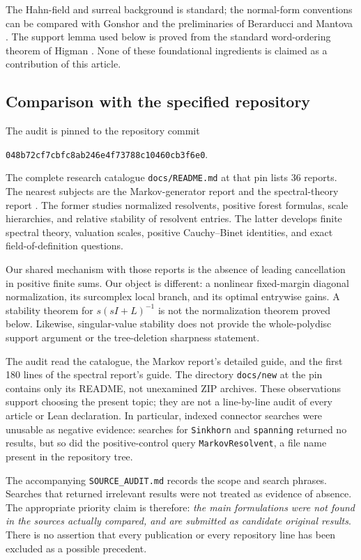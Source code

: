 \documentclass[11pt,a4paper]{article}
\numberwithin{equation}{section}
\theoremstyle{definition}
\newcommand{\pin}{048b72cf7cbfc8ab246e4f73788c10460cb3f6e0}
\begin{document}
The Hahn-field and surreal background is standard; the normal-form
conventions can be compared with Gonshor \cite{Gonshor} and the
preliminaries of Berarducci and Mantova \cite{BM}. The support lemma
used below is proved from the standard word-ordering theorem of
Higman \cite{Higman}. None of these foundational ingredients is
claimed as a contribution of this article.

\subsection{Comparison with the specified repository}
The audit is pinned to the repository commit
\begin{center}\small\texttt{\pin}.\end{center}
The complete research catalogue \texttt{docs/README.md} at that pin
lists 36 reports. The nearest subjects are the Markov-generator report
and the spectral-theory report \cite{RepoCatalogue,RepoMarkov,RepoSpectral}.
The former studies normalized resolvents, positive forest formulas,
scale hierarchies, and relative stability of resolvent entries. The
latter develops finite spectral theory, valuation scales, positive
Cauchy--Binet identities, and exact field-of-definition questions.

Our shared mechanism with those reports is the absence of leading
cancellation in positive finite sums. Our object is different: a
nonlinear fixed-margin diagonal normalization, its surcomplex local
branch, and its optimal entrywise gains. A stability theorem for
$s(sI+L)^{-1}$ is not the normalization theorem proved below.
Likewise, singular-value stability does not provide the whole-polydisc
support argument or the tree-deletion sharpness statement.

The audit read the catalogue, the Markov report's detailed guide, and
the first 180 lines of the spectral report's guide. The directory
\texttt{docs/new} at the pin contains only its README, not unexamined
ZIP archives. These observations support choosing the present topic;
they are not a line-by-line audit of every article or Lean declaration.
In particular, indexed connector searches were unusable as negative
evidence: searches for \texttt{Sinkhorn} and \texttt{spanning} returned
no results, but so did the positive-control query
\texttt{MarkovResolvent}, a file name present in the repository tree.

The accompanying \texttt{SOURCE\_AUDIT.md} records the scope and search
phrases. Searches that returned irrelevant results were not treated as
evidence of absence. The appropriate priority claim is therefore:
\emph{the main formulations were not found in the sources actually
compared, and are submitted as candidate original results}. There is
no assertion that every publication or every repository line has been
excluded as a possible precedent.
\end{document}
